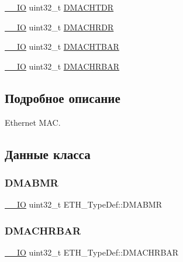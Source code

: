 \begin{DoxyCompactItemize}
\mbox{\hyperlink{group___c_m_s_i_s___c_m3__core__definitions_gaec43007d9998a0a0e01faede4133d6be}{\+\_\+\+\_\+\+IO}} uint32\+\_\+t \mbox{\hyperlink{struct_e_t_h___type_def_ab02310e389320a383022b666af621ba9}{D\+M\+A\+C\+H\+T\+DR}}
\item 
\mbox{\hyperlink{group___c_m_s_i_s___c_m3__core__definitions_gaec43007d9998a0a0e01faede4133d6be}{\+\_\+\+\_\+\+IO}} uint32\+\_\+t \mbox{\hyperlink{struct_e_t_h___type_def_ab4a222f725cc43952993519b20466637}{D\+M\+A\+C\+H\+R\+DR}}
\item 
\mbox{\hyperlink{group___c_m_s_i_s___c_m3__core__definitions_gaec43007d9998a0a0e01faede4133d6be}{\+\_\+\+\_\+\+IO}} uint32\+\_\+t \mbox{\hyperlink{struct_e_t_h___type_def_abb2eba5ee2a1621abeeb59e3aadc0318}{D\+M\+A\+C\+H\+T\+B\+AR}}
\item 
\mbox{\hyperlink{group___c_m_s_i_s___c_m3__core__definitions_gaec43007d9998a0a0e01faede4133d6be}{\+\_\+\+\_\+\+IO}} uint32\+\_\+t \mbox{\hyperlink{struct_e_t_h___type_def_a03160db5ffae457bab55c0358c4ef998}{D\+M\+A\+C\+H\+R\+B\+AR}}
\end{DoxyCompactItemize}


\subsection{Подробное описание}
Ethernet M\+AC. 

\subsection{Данные класса}
\mbox{\label{struct_e_t_h___type_def_a32b1c260b8ab0b3f67cbfa97f4d910d1}} 
\subsubsection{\texorpdfstring{DMABMR}{DMABMR}}
{\footnotesize\ttfamily \mbox{\hyperlink{group___c_m_s_i_s___c_m3__core__definitions_gaec43007d9998a0a0e01faede4133d6be}{\+\_\+\+\_\+\+IO}} uint32\+\_\+t E\+T\+H\+\_\+\+Type\+Def\+::\+D\+M\+A\+B\+MR}

\mbox{\label{struct_e_t_h___type_def_a03160db5ffae457bab55c0358c4ef998}} 
\subsubsection{\texorpdfstring{DMACHRBAR}{DMACHRBAR}}
{\footnotesize\ttfamily \mbox{\hyperlink{group___c_m_s_i_s___c_m3__core__definitions_gaec43007d9998a0a0e01faede4133d6be}{\+\_\+\+\_\+\+IO}} uint32\+\_\+t E\+T\+H\+\_\+\+Type\+Def\+::\+D\+M\+A\+C\+H\+R\+B\+AR}

